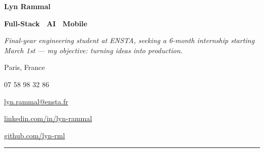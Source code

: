 \documentclass[10pt,a4paper]{article}
\makeatletter
\newcommand{\cvphone}{07 58 98 32 86}
\newcommand{\cvemail}{lyn.rammal@ensta.fr}
\newcommand{\cvlinkedin}{linkedin.com/in/lyn-rammal}
\newcommand{\cvgithub}{github.com/lyn-rml}
\newcommand{\cvlocation}{Paris, France}
\makeatother
\begin{document}
\begin{minipage}[t]{0.6\linewidth}
  {\fontsize{22}{24}\selectfont\bfseries\color{darkgray} Lyn Rammal}\par
  \vspace{2pt}
  {\small\bfseries\color{accent} Full-Stack \textperiodcentered\ AI \textperiodcentered\ Mobile}\par
  \vspace{6pt}
  {\normalsize\itshape\color{midgray}
  Final-year engineering student at ENSTA, seeking a 6-month internship starting March 1st --- my objective: turning ideas into production.
  }\par
\end{minipage}%
\hfill
\begin{minipage}[t]{0.35\linewidth}
  \raggedleft
  {\small\color{darkgray} \cvlocation}\par
  \vspace{4pt}
  {\small\color{darkgray} \cvphone}\par
  \vspace{4pt}
  {\small\color{darkgray} \href{mailto:\cvemail}{\cvemail}}\par
  \vspace{4pt}
  {\small\color{darkgray} \href{https://\cvlinkedin}{\cvlinkedin}}\par
  \vspace{4pt}
  {\small\color{darkgray} \href{https://\cvgithub}{\cvgithub}}\par
\end{minipage}

\vspace{10pt}
{\color{accent}\rule{\linewidth}{0.8pt}}\par
\vspace{10pt}

\setlength{\columnsep}{22pt}
\setlength{\columnseprule}{0pt}
\end{document}
